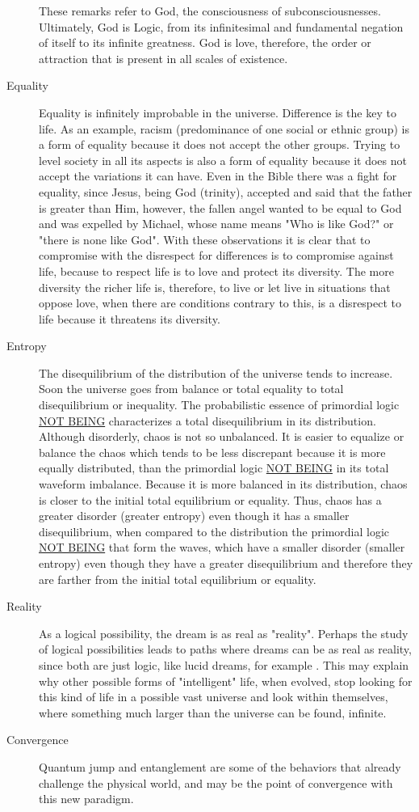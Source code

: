\begin{description}
\begin{description}
	   \end{description}
	These remarks refer to God, the consciousness of subconsciousnesses. Ultimately, God is Logic, from its infinitesimal and fundamental negation of itself to its infinite greatness. God is love, therefore, the order or attraction that is present in all scales of existence.
	   \item[Equality] Equality is infinitely improbable in the universe. Difference is the key to life. As an example, racism (predominance of one social or ethnic group) is a form of equality because it does not accept the other groups. Trying to level society in all its aspects is also a form of equality because it does not accept the variations it can have. Even in the Bible there was a fight for equality, since Jesus, being God (trinity), accepted and said that the father is greater than Him, however, the fallen angel wanted to be equal to God and was expelled by Michael, whose name means "Who is like God?" or "there is none like God". With these observations it is clear that to compromise with the disrespect for differences is to compromise against life, because to respect life is to love and protect its diversity. The more diversity the richer life is, therefore, to live or let live in situations that oppose love, when there are conditions contrary to this, is a disrespect to life because it threatens its diversity.
	   \item[Entropy] The disequilibrium of the distribution of the universe tends to increase. Soon the universe goes from balance or total equality to total disequilibrium or inequality. The probabilistic essence of primordial logic \underline{NOT BEING} characterizes a total disequilibrium in its distribution. Although disorderly, chaos is not so unbalanced. It is easier to equalize or balance the chaos which tends to be less discrepant because it is more equally distributed, than the primordial logic \underline{NOT BEING} in its total waveform imbalance. Because it is more balanced in its distribution, chaos is closer to the initial total equilibrium or equality. Thus, chaos has a greater disorder (greater entropy) even though it has a smaller disequilibrium, when compared to the distribution the primordial logic \underline{NOT BEING} that form the waves, which have a smaller disorder (smaller entropy) even though they have a greater disequilibrium and therefore they are farther from the initial total equilibrium or equality.
	   \item[Reality] As a logical possibility, the dream is as real as "reality". Perhaps the study of logical possibilities leads to paths where dreams can be as real as reality, since both are just logic, like lucid dreams, for example \cite{lucid_dreams}.  This may explain why other possible forms of "intelligent" life, when evolved, stop looking for this kind of life in a possible vast universe and look within themselves, where something much larger than the universe can be found, infinite.
	   \item[Convergence] Quantum jump and entanglement are some of the behaviors that already challenge the physical world, and may be the point of convergence with this new paradigm.
	\end{description}